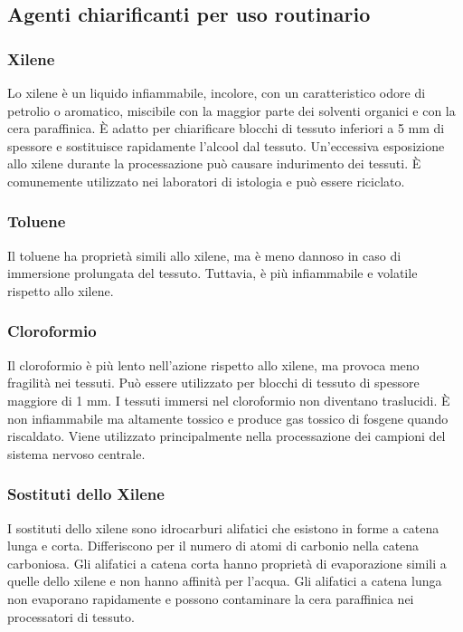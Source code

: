 \subsection{Agenti chiarificanti per uso routinario}

\subsubsection{Xilene}
Lo xilene è un liquido infiammabile, incolore, con un caratteristico odore di petrolio o aromatico, miscibile con la maggior parte dei solventi organici e con la cera paraffinica. È adatto per chiarificare blocchi di tessuto inferiori a 5 mm di spessore e sostituisce rapidamente l'alcool dal tessuto. Un'eccessiva esposizione allo xilene durante la processazione può causare indurimento dei tessuti. È comunemente utilizzato nei laboratori di istologia e può essere riciclato.

\subsubsection{Toluene}
Il toluene ha proprietà simili allo xilene, ma è meno dannoso in caso di immersione prolungata del tessuto. Tuttavia, è più infiammabile e volatile rispetto allo xilene.

\subsubsection{Cloroformio}
Il cloroformio è più lento nell'azione rispetto allo xilene, ma provoca meno fragilità nei tessuti. Può essere utilizzato per blocchi di tessuto di spessore maggiore di 1 mm. I tessuti immersi nel cloroformio non diventano traslucidi. È non infiammabile ma altamente tossico e produce gas tossico di fosgene quando riscaldato. Viene utilizzato principalmente nella processazione dei campioni del sistema nervoso centrale.

\subsubsection{Sostituti dello Xilene}
I sostituti dello xilene sono idrocarburi alifatici che esistono in forme a catena lunga e corta. Differiscono per il numero di atomi di carbonio nella catena carboniosa. Gli alifatici a catena corta hanno proprietà di evaporazione simili a quelle dello xilene e non hanno affinità per l'acqua. Gli alifatici a catena lunga non evaporano rapidamente e possono contaminare la cera paraffinica nei processatori di tessuto.

